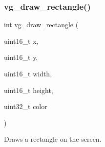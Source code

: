 \subsubsection{\texorpdfstring{vg\+\_\+draw\+\_\+rectangle()}{vg\_draw\_rectangle()}}
{\footnotesize\ttfamily int vg\+\_\+draw\+\_\+rectangle (\begin{DoxyParamCaption}\item[{uint16\+\_\+t}]{x,  }\item[{uint16\+\_\+t}]{y,  }\item[{uint16\+\_\+t}]{width,  }\item[{uint16\+\_\+t}]{height,  }\item[{uint32\+\_\+t}]{color }\end{DoxyParamCaption})}



Draws a rectangle on the screen. 


